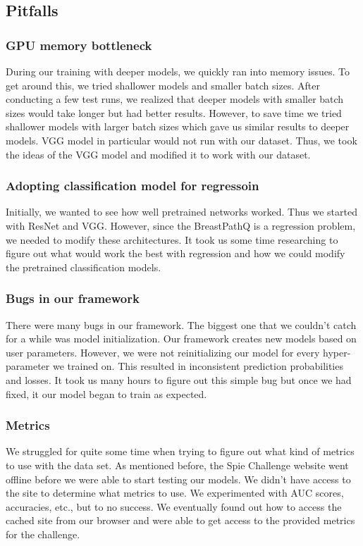 \documentclass[11pt]{ieeeconf}
\begin{document}
\subsection{Pitfalls}
\subsubsection{GPU memory bottleneck}
During our training with deeper models, we quickly ran into memory issues. To get around this, we tried shallower models and smaller batch sizes. After conducting a few test runs, we realized that deeper models with smaller batch sizes would take longer but had better results. However, to save time we tried shallower models with larger batch sizes which gave us similar results to deeper models. VGG model in particular would not run with our dataset. Thus, we took the ideas of the VGG model and modified it to work with our dataset.

\subsubsection{Adopting classification model for regressoin}
Initially, we wanted to see how well pretrained networks worked. Thus we started with ResNet and VGG. However, since the BreastPathQ is a regression problem, we needed to modify these architectures. It took us some time researching to figure out what would work the best with regression and how we could modify the pretrained classification models.

\subsubsection{Bugs in our framework}
There were many bugs in our framework. The biggest one that we couldn’t catch for a while was model initialization. Our framework creates new models based on user parameters. However, we were not reinitializing our model for every hyper-parameter we trained on. This resulted in inconsistent prediction probabilities and losses. It took us many hours to figure out this simple bug but once we had fixed, it our model began to train as expected.

\subsubsection{Metrics}
We struggled for quite some time when trying to figure out what kind of metrics to use with the data set. As mentioned before, the Spie Challenge website went offline before we were able to start testing our models. We didn’t have access to the site to determine what metrics to use. We experimented with AUC scores, accuracies, etc., but to no success. We eventually found out how to access the cached site from our browser and were able to get access to the provided metrics for the challenge.
\end{document}
